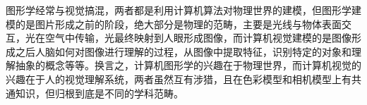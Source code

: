 图形学经常与视觉搞混，两者都是利用计算机算法对物理世界的建模，但图形学建模的是图片形成之前的阶段，绝大部分是物理的范畴，主要是光线与物体表面交互，光在空气中传输，光最终映射到人眼形成图像，而计算机视觉建模的是图像形成之后人脑如何对图像进行理解的过程，从图像中提取特征，识别特定的对象和理解抽象的概念等等。换言之，计算机图形学的兴趣在于物理世界，而计算机视觉的兴趣在于人的视觉理解系统，两者虽然互有涉猎，且在色彩模型和相机模型上有共通知识，但归根到底是不同的学科范畴。
